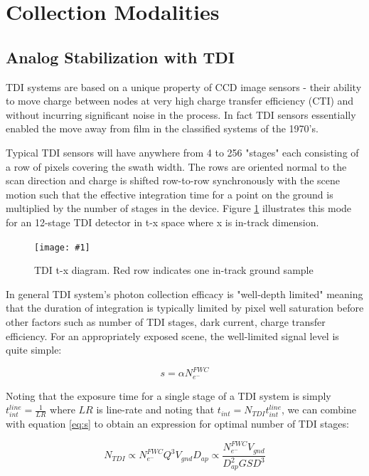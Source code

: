 \documentclass[10pt,journal]{IEEEtran}  %
\newcommand{\includefigure}[3]
{
  \begin{figure}[h!]
  \centering
  \texttt{[image: \#1]}
  \caption[]{#3}
  \label{#2}
  \end{figure}
}
\begin{document}
\section{Collection Modalities}
\label{sec:modalities}

\subsection{Analog Stabilization with TDI}

TDI systems are based on a unique property of CCD image sensors - their ability to move charge between nodes at very high charge transfer efficiency (CTI) and without incurring significant noise in the process.  In fact TDI sensors essentially enabled the move away from film in the classified systems of the 1970's.

Typical TDI sensors will have anywhere from 4 to 256 "stages" each consisting of a row of pixels covering the swath width.  The rows are oriented normal to the scan direction and charge is shifted row-to-row synchronously with the scene motion such that the effective integration time for a point on the ground is multiplied by the number of stages in the device.  Figure \ref{fig:tdi} illustrates this mode for an 12-stage TDI detector in t-x space where x is in-track dimension.

\includefigure{figures/tdi.pgf}{fig:tdi}{TDI t-x diagram.  Red row indicates one in-track ground sample}

In general TDI system's photon collection efficacy is "well-depth limited" meaning that the duration of integration is typically limited by pixel well saturation before other factors such as number of TDI stages, dark current, charge transfer efficiency.  For an appropriately exposed scene, the well-limited signal level is quite simple:

\begin{equation}
s = \alpha N_{e^-}^{FWC}
\label{eq:well_limited}
\end{equation}

Noting that the exposure time for a single stage of a TDI system is simply $t_{int}^{line} = \frac{1}{LR}$ where $LR$ is line-rate and noting that $t_{int} = N_{TDI}t_{int}^{line}$, we can combine with equation \ref{eq:s} to obtain an expression for optimal number of TDI stages:

\begin{equation}
N_{TDI} \propto N_{e^-}^{FWC} Q^3 V_{gnd}D_{ap} \propto \frac{N_{e^-}^{FWC}V_{gnd}}{D_{ap}^2 GSD^3}
\label{eq:n_tdi}
\end{equation}
\end{document}
